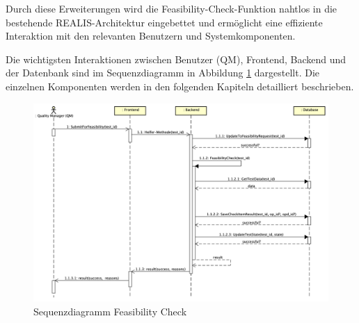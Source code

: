 Durch diese Erweiterungen wird die Feasibility-Check-Funktion nahtlos in die bestehende REALIS-Architektur eingebettet und ermöglicht eine effiziente Interaktion mit den relevanten Benutzern und Systemkomponenten.

Die wichtigsten Interaktionen zwischen Benutzer (\gls{QM}), Frontend, Backend und der Datenbank sind im Sequenzdiagramm in Abbildung \ref{fig:sequence-diagram} dargestellt. Die einzelnen Komponenten werden in den folgenden Kapiteln detailliert beschrieben. 

\begin{figure}[!htbp]
    \centering
    \includegraphics[width=1\textwidth]{bilder/Feasibility-Sequenz-Diagramm.png}
    \caption{Sequenzdiagramm Feasibility Check}
    \label{fig:sequence-diagram}
\end{figure}


